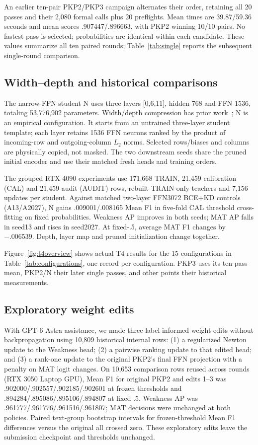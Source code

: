 \documentclass[10pt,conference]{IEEEtran}
\begin{document}
An earlier ten-pair PKP2/PKP3 campaign alternates their order, retaining all 20 passes and their 2,080 formal calls plus 20 preflights. Mean times are 39.87/59.36 seconds and mean scores .907447/.896663, with PKP2 winning 10/10 pairs. No fastest pass is selected; probabilities are identical within each candidate. These values summarize all ten paired rounds; Table~\ref{tab:single} reports the subsequent single-round comparison.

\subsection{Width--depth and historical comparisons}
The narrow-FFN student N uses three layers [0,6,11], hidden 768 and FFN 1536, totaling 53,776,902 parameters. Width/depth compression has prior work~\cite{dynabert}; N is an empirical configuration. It starts from an untrained three-layer student template; each layer retains 1536 FFN neurons ranked by the product of incoming-row and outgoing-column $L_2$ norms. Selected rows/biases and columns are physically copied, not masked. The two downstream seeds share the pruned initial encoder and use their matched fresh heads and training orders.

The grouped RTX 4090 experiments use 171,668 TRAIN, 21,459 calibration (CAL) and 21,459 audit (AUDIT) rows, rebuilt TRAIN-only teachers and 7,156 updates per student. Against matched two-layer FFN3072 BCE+KD controls (A13/A2027), N gains .009001/.008165 Mean F1 in five-fold CAL threshold cross-fitting on fixed probabilities. Weakness AP improves in both seeds; MAT AP falls in seed13 and rises in seed2027. At fixed-.5, average MAT F1 changes by $-.006539$. Depth, layer map and pruned initialization change together.

Figure~\ref{fig:t4overview} shows actual T4 results for the 15 configurations in Table~\ref{tab:configurations}, one record per configuration. PKP3 uses its ten-pass mean, PKP2/N their later single passes, and other points their historical measurements.

\subsection{Exploratory weight edits}
With GPT-6 Astra assistance, we made three label-informed weight edits without backpropagation using 10,809 historical internal rows: (1) a regularized Newton update to the Weakness head; (2) a pairwise ranking update to that edited head; and (3) a rank-one update to the original PKP2's final FFN projection with a penalty on MAT logit changes. On 10,653 comparison rows reused across rounds (RTX 3050 Laptop GPU), Mean F1 for original PKP2 and edits 1--3 was .902000/.902557/.902185/.902601 at frozen thresholds and .894284/.895086/.895106/.894807 at fixed .5. Weakness AP was .961777/.961776/.961516/.961807; MAT decisions were unchanged at both policies. Paired text-group bootstrap intervals for frozen-threshold Mean F1 differences versus the original all crossed zero. These exploratory edits leave the submission checkpoint and thresholds unchanged.
\end{document}
